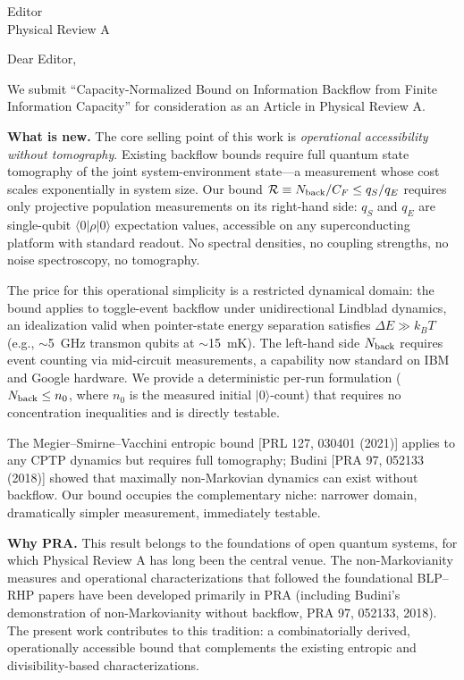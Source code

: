 \documentclass[12pt]{letter}
\begin{document}
\begin{letter}{Editor\\Physical Review A}

\opening{Dear Editor,}

We submit ``Capacity-Normalized Bound on Information Backflow from Finite Information Capacity'' for consideration as an Article in Physical Review A.

\textbf{What is new.}
The core selling point of this work is \textit{operational accessibility without tomography}. Existing backflow bounds require full quantum state tomography of the joint system-environment state---a measurement whose cost scales exponentially in system size. Our bound $\mathcal{R} \equiv N_{\rm back}/C_F \leq q_S/q_E$ requires only projective population measurements on its right-hand side: $q_S$ and $q_E$ are single-qubit $\langle 0|\rho|0\rangle$ expectation values, accessible on any superconducting platform with standard readout. No spectral densities, no coupling strengths, no noise spectroscopy, no tomography.

The price for this operational simplicity is a restricted dynamical domain: the bound applies to toggle-event backflow under unidirectional Lindblad dynamics, an idealization valid when pointer-state energy separation satisfies $\Delta E \gg k_B T$ (e.g., $\sim$5~GHz transmon qubits at $\sim$15~mK). The left-hand side $N_{\rm back}$ requires event counting via mid-circuit measurements, a capability now standard on IBM and Google hardware. We provide a deterministic per-run formulation ($N_{\rm back} \leq n_0$, where $n_0$ is the measured initial $|0\rangle$-count) that requires no concentration inequalities and is directly testable.

The Megier--Smirne--Vacchini entropic bound [PRL 127, 030401 (2021)] applies to any CPTP dynamics but requires full tomography; Budini [PRA 97, 052133 (2018)] showed that maximally non-Markovian dynamics can exist without backflow. Our bound occupies the complementary niche: narrower domain, dramatically simpler measurement, immediately testable.

\textbf{Why PRA.}
This result belongs to the foundations of open quantum systems, for which Physical Review A has long been the central venue. The non-Markovianity measures and operational characterizations that followed the foundational BLP--RHP papers have been developed primarily in PRA (including Budini's demonstration of non-Markovianity without backflow, PRA 97, 052133, 2018). The present work contributes to this tradition: a combinatorially derived, operationally accessible bound that complements the existing entropic and divisibility-based characterizations.


\end{letter}
\end{document}
